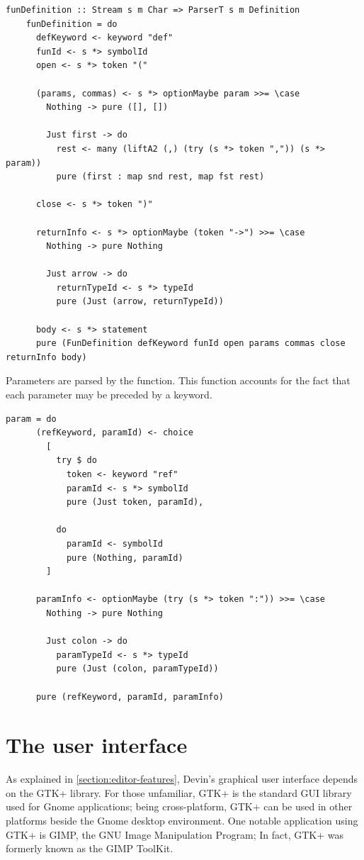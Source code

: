 \documentclass[UdineBachThesis,american,11pt]{PhdThesis}
\begin{document}
  \begin{lstlisting}[gobble=4,basicstyle=\ttfamily\small]
    funDefinition :: Stream s m Char => ParserT s m Definition
    funDefinition = do
      defKeyword <- keyword "def"
      funId <- s *> symbolId
      open <- s *> token "("

      (params, commas) <- s *> optionMaybe param >>= \case
        Nothing -> pure ([], [])

        Just first -> do
          rest <- many (liftA2 (,) (try (s *> token ",")) (s *> param))
          pure (first : map snd rest, map fst rest)

      close <- s *> token ")"

      returnInfo <- s *> optionMaybe (token "->") >>= \case
        Nothing -> pure Nothing

        Just arrow -> do
          returnTypeId <- s *> typeId
          pure (Just (arrow, returnTypeId))

      body <- s *> statement
      pure (FunDefinition defKeyword funId open params commas close returnInfo body)
  \end{lstlisting}

  Parameters are parsed by the \lstinline@param@ function. This function
  accounts for the fact that each parameter may be preceded by a \lstinline@ref@
  keyword.

  \begin{lstlisting}[gobble=4,basicstyle=\ttfamily\small]
    param = do
      (refKeyword, paramId) <- choice
        [
          try $ do
            token <- keyword "ref"
            paramId <- s *> symbolId
            pure (Just token, paramId),

          do
            paramId <- symbolId
            pure (Nothing, paramId)
        ]

      paramInfo <- optionMaybe (try (s *> token ":")) >>= \case
        Nothing -> pure Nothing

        Just colon -> do
          paramTypeId <- s *> typeId
          pure (Just (colon, paramTypeId))

      pure (refKeyword, paramId, paramInfo)
  \end{lstlisting}

  \section{The user interface}

  As explained in \autoref{section:editor-features}, Devin's graphical user
  interface depends on the GTK+ library. For those unfamiliar, GTK+ is the
  standard GUI library used for Gnome applications; being cross-platform, GTK+
  can be used in other platforms beside the Gnome desktop environment. One
  notable application using GTK+ is GIMP, the GNU Image Manipulation Program; In
  fact, GTK+ was formerly known as the GIMP ToolKit.
\end{document}
